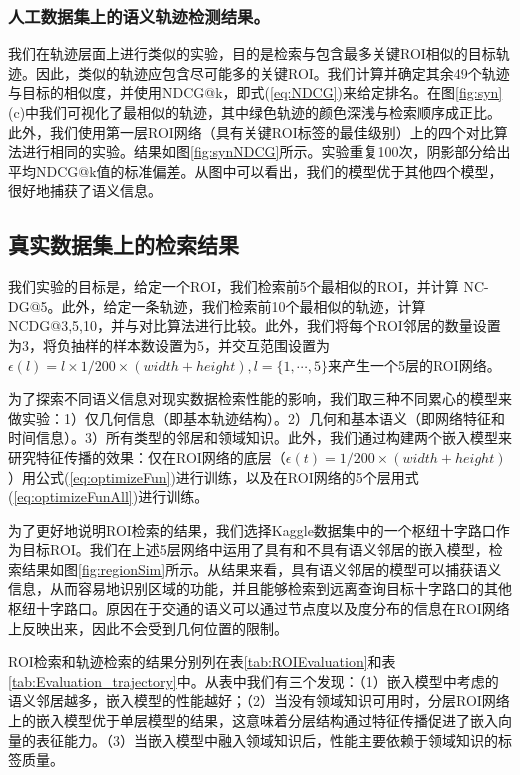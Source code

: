 \subsubsection{人工数据集上的语义轨迹检测结果。}
我们在轨迹层面上进行类似的实验，目的是检索与包含最多关键ROI相似的目标轨迹。因此，类似的轨迹应包含尽可能多的关键ROI。我们计算并确定其余49个轨迹与目标的相似度，并使用NDCG@k，即式(\ref{eq:NDCG})来给定排名。在图\ref{fig:syn}(c)中我们可视化了最相似的轨迹，其中绿色轨迹的颜色深浅与检索顺序成正比。此外，我们使用第一层ROI网络（具有关键ROI标签的最佳级别）上的四个对比算法进行相同的实验。结果如图\ref{fig:synNDCG}所示。实验重复100次，阴影部分给出平均NDCG@k值的标准偏差。从图中可以看出，我们的模型优于其他四个模型，很好地捕获了语义信息。




\subsection{真实数据集上的检索结果}

我们实验的目标是，给定一个ROI，我们检索前5个最相似的ROI，并计算 NC-DG@5。此外，给定一条轨迹，我们检索前10个最相似的轨迹，计算NCDG@3,5,10，并与对比算法进行比较。此外，我们将每个ROI邻居的数量设置为3，将负抽样的样本数设置为5，并交互范围设置为$\epsilon(l) = l \times 1/200\times(width + height), l = \{1,\cdots,5\}$来产生一个5层的ROI网络。

为了探索不同语义信息对现实数据检索性能的影响，我们取三种不同累心的模型来做实验：1）仅几何信息（即基本轨迹结构）。2）几何和基本语义（即网络特征和时间信息）。3）所有类型的邻居和领域知识。此外，我们通过构建两个嵌入模型来研究特征传播的效果：仅在ROI网络的底层（$\epsilon(t) = 1/200 \times(width + height)$）用公式(\ref{eq:optimizeFun})进行训练，以及在ROI网络的5个层用式(\ref{eq:optimizeFunAll})进行训练。

为了更好地说明ROI检索的结果，我们选择Kaggle数据集中的一个枢纽十字路口作为目标ROI。我们在上述5层网络中运用了具有和不具有语义邻居的嵌入模型，检索结果如图\ref{fig:regionSim}所示。从结果来看，具有语义邻居的模型可以捕获语义信息，从而容易地识别区域的功能，并且能够检索到远离查询目标十字路口的其他枢纽十字路口。原因在于交通的语义可以通过节点度以及度分布的信息在ROI网络上反映出来，因此不会受到几何位置的限制。

ROI检索和轨迹检索的结果分别列在表\ref{tab:ROIEvaluation}和表\ref{tab:Evaluation_trajectory}中。从表中我们有三个发现：（1）嵌入模型中考虑的语义邻居越多，嵌入模型的性能越好；（2）当没有领域知识可用时，分层ROI网络上的嵌入模型优于单层模型的结果，这意味着分层结构通过特征传播促进了嵌入向量的表征能力。（3）当嵌入模型中融入领域知识后，性能主要依赖于领域知识的标签质量。


